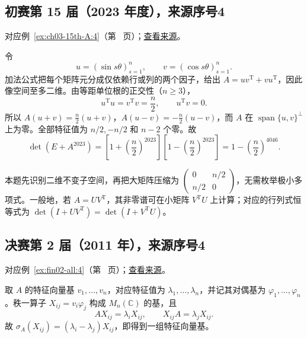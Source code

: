\documentclass[UTF8,12pt,a4paper,fontset=fandol]{ctexart}
\begin{document}
\subsection{初赛第 15 届（2023 年度），来源序号4}\label{ans:ch03-15th-A:4}\label{pr:ch03-15th-A:4}

对应例~\ref{ex:ch03-15th-A:4}（第~\pageref{ex:ch03-15th-A:4} 页）；\href{https://github.com/lzxcr/cmc-mathematics/blob/64916fa1fdbc3e444a652eca204d5669058ee321/src/problems/preliminary/15/04.md}{查看来源}。

\begin{solve}

令
\[
u=(\sin s\theta)_{s=1}^n,\qquad v=(\cos s\theta)_{s=1}^n.
\]
加法公式把每个矩阵元分成仅依赖行或列的两个因子，给出 $A=uv^{\mathrm T}+vu^{\mathrm T}$，因此像空间至多二维。由等距单位根的正交性（$n\geq3$），
\[
u^{\mathrm T}u=v^{\mathrm T}v=\frac n2,
\qquad u^{\mathrm T}v=0.
\]
所以 $A(u+v)=\tfrac n2(u+v)$，$A(u-v)=-\tfrac n2(u-v)$，而 $A$ 在 $\operatorname{span}\{u,v\}^{\perp}$ 上为零。全部特征值为 $n/2,-n/2$ 和 $n-2$ 个零。故
\[
\det(E+A^{2023})
=\left[1+\left(\frac n2\right)^{2023}\right]
 \left[1-\left(\frac n2\right)^{2023}\right]
=1-\left(\frac n2\right)^{4046}.
\]

\end{solve}

\begin{remark}[方法与条件]

本题先识别二维不变子空间，再把大矩阵压缩为 $\begin{pmatrix}0&n/2\\n/2&0\end{pmatrix}$，无需枚举极小多项式。一般地，若 $A=UV^{\mathrm T}$，其非零谱可在小矩阵 $V^{\mathrm T}U$ 上计算；对应的行列式恒等式为 $\det(I+UV^{\mathrm T})=\det(I+V^{\mathrm T}U)$。

\end{remark}

\subsection{决赛第 2 届（2011 年），来源序号4}\label{ans:fin02-all:4}\label{pr:fin02-all:4}

对应例~\ref{ex:fin02-all:4}（第~\pageref{ex:fin02-all:4} 页）；\href{https://github.com/lzxcr/cmc-mathematics/blob/64916fa1fdbc3e444a652eca204d5669058ee321/src/problems/finals/02/04.md}{查看来源}。

\begin{solve}

取 $A$ 的特征向量基 $v_1,\ldots,v_n$，对应特征值为 $\lambda_1,\ldots,\lambda_n$，并记其对偶基为 $\varphi_1,\ldots,\varphi_n$。秩一算子
$X_{ij}=v_i\varphi_j$ 构成 $M_n(\mathbb C)$ 的基，且
\[
AX_{ij}=\lambda_iX_{ij},\qquad X_{ij}A=\lambda_jX_{ij}.
\]
故 $\sigma_A(X_{ij})=(\lambda_i-\lambda_j)X_{ij}$，即得到一组特征向量基。

\end{solve}
\end{document}

